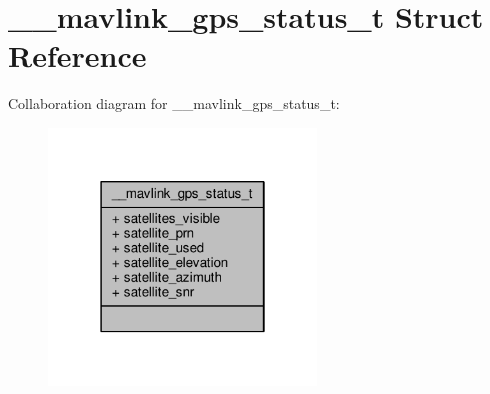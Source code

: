 \hypertarget{struct____mavlink__gps__status__t}{\section{\+\_\+\+\_\+mavlink\+\_\+gps\+\_\+status\+\_\+t Struct Reference}
\label{struct____mavlink__gps__status__t}
}


Collaboration diagram for \+\_\+\+\_\+mavlink\+\_\+gps\+\_\+status\+\_\+t\+:
\nopagebreak
\begin{figure}[H]
\begin{center}
\leavevmode
\includegraphics[width=202pt]{struct____mavlink__gps__status__t__coll__graph}
\end{center}
\end{figure}
